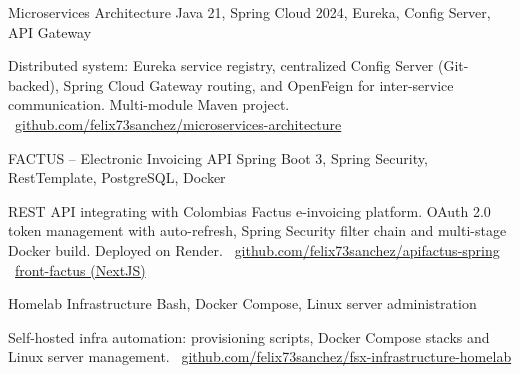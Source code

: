 \documentclass[]{awesome-cv}
\begin{document}
\begin{cventries}
	\vspace{-3mm}
	\cventry
	{}
	{Microservices Architecture \vspace{-5mm}}
	{Java 21, Spring Cloud 2024, Eureka, Config Server, API Gateway \vspace{-5mm}}
	{}
	{\begin{cvsectionnormaltext}
		\item {Distributed system: Eureka service registry, centralized Config Server (Git-backed), Spring Cloud Gateway routing, and OpenFeign for inter-service communication. Multi-module Maven project.
		\newline \faGithubSquare\ \href{https://github.com/felix73sanchez/microservices-architecture}{github.com/felix73sanchez/microservices-architecture}}
	\end{cvsectionnormaltext}}

	\vspace{-3mm}
	\cventry
	{}
	{FACTUS -- Electronic Invoicing API \vspace{-5mm}}
	{Spring Boot 3, Spring Security, RestTemplate, PostgreSQL, Docker \vspace{-5mm}}
	{}
	{\begin{cvsectionnormaltext}
		\item {REST API integrating with Colombia\textquotesingle{}s Factus e-invoicing platform. OAuth 2.0 token management with auto-refresh, Spring Security filter chain and multi-stage Docker build. Deployed on Render.
		\newline \faGithubSquare\ \href{https://github.com/felix73sanchez/apifactus-spring}{github.com/felix73sanchez/apifactus-spring}
		\hspace{1mm} \faGithubSquare\ \href{https://github.com/felix73sanchez/front-factus}{front-factus (NextJS)}}
	\end{cvsectionnormaltext}}

	\vspace{-3mm}
	\cventry
	{}
	{Homelab Infrastructure \vspace{-5mm}}
	{Bash, Docker Compose, Linux server administration \vspace{-5mm}}
	{}
	{\begin{cvsectionnormaltext}
		\item {Self-hosted infra automation: provisioning scripts, Docker Compose stacks and Linux server management.
		\newline \faGithubSquare\ \href{https://github.com/felix73sanchez/fsx-infrastructure-homelab}{github.com/felix73sanchez/fsx-infrastructure-homelab}}
	\end{cvsectionnormaltext}}

	\vspace{-5mm}

\end{cventries}
\end{document}
